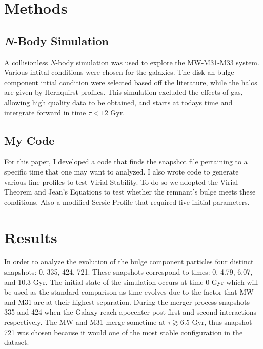 \documentclass[iop]{emulateapj}
\begin{document}
\section{Methods}
\subsection{\textit{N}-Body Simulation}
A collisionless \textit{N}-body simulation was used to explore the MW-M31-M33 system. Various intital conditions were chosen for the galaxies. The disk an bulge component intial condition were selected based off the literature, while the halos are given by Hernquirst profiles. This simulation excluded the effects of gas, allowing high quality data to be obtained, and starts at todays time and intergrate forward in time $\tau<12$ Gyr. \citep{van2012m31}

\subsection{My Code}
For this paper, I developed a code that finds the snapshot file pertaining to a specific time that one may want to analyzed. I also wrote code to generate various line profiles to test Virial Stability. To do so we adopted the Virial Theorem and Jean's Equations to test whether the remnant's bulge meets these conditions. Also a modified Sersic Profile that required five initial parameters. 	










\section{Results}
In order to analyze the evolution of the bulge component particles four distinct snapshots: 0, 335, 424, 721. These snapshots correspond to times: 0, 4.79, 6.07, and 10.3 Gyr. The initial state of the simulation occurs at time 0 Gyr which will be used as the standard comparison as time evolves due to the factor that MW and M31 are at their highest separation. During the merger process snapshots 335 and 424 when the Galaxy reach apocenter post first and second interactions respectively. The MW and M31 merge sometime at $\tau\gtrsim6.5$ Gyr, thus snapshot 721 was chosen because it would one of the most stable configuration in the dataset.
\end{document}
